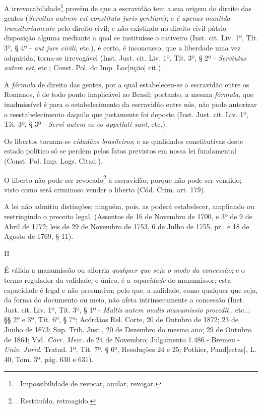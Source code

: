 A irrevocabilidade\footnote{. Impossibilidade de revocar, anular,
  revogar.} provém de que a escravidão tem a sua origem do direito das
gentes (\emph{Servitus autrem est constituto juris gentium}); e \emph{é
apenas mantida transitoriamente} pelo direito civil; e não existindo no
direito civil pátrio disposição alguma mediante a qual se instituísse o
cativeiro (Inst. cit. Liv. 1º, Tít. 3º, § 4º - \emph{aut jure civili},
etc.), é certo, é inconcusso, que a liberdade uma vez adquirida,
torna-se irrevogável (Inst. Just. cit. Liv. 1º, Tít. 3º, § 2º -
\emph{Serviutus autem est}, etc.; Const. Pol. do Imp. Loc{[}ução{]}
cit.).

A \emph{fórmula} de direito das gentes, por a qual estabeleceu-se a
escravidão entre os Romanos, é de todo ponto inaplicável ao Brasil;
portanto, a mesma \emph{fórmula}, que inadmissível é para o
estabelecimento da escravidão entre nós, não pode autorizar o
reestabelecimento daquilo que justamente foi deposto (Inst. Just. cit.
Liv. 1º, Tít. 3º, § 3º - \emph{Servi autem ex eo appellati sunt}, etc.).

Os libertos tornam-se \emph{cidadãos brasileiros}; e as qualidades
constitutivas deste estado político só se perdem pelos fatos previstos
em nossa lei fundamental (Const. Pol. Imp. Logs. Citad.).

O liberto não pode ser revocado\footnote{. Restituído, retroagido.} à
escravidão; porque não pode ser vendido; visto como será criminoso
vender o liberto (Cód. Crim. art. 179).

A lei não admitiu distinções; ninguém, pois, as poderá estabelecer,
ampliando ou restringindo o preceito legal. (Assentos de 16 de Novembro
de 1700, e 3º de 9 de Abril de 1772; leis de 29 de Novembro de 1753, 6
de Julho de 1755, pr., e 18 de Agosto de 1769, § 11).

II

É válida a manumissão ou alforria \emph{qualquer que seja o modo da
concessão}; e o termo regulador da validade, e único, é a
\emph{capacidade} do manumissor; esta capacidade é legal e não
presuntiva; pelo que, a nulidade, como qualquer que seja, da forma do
documento ou meio, não afeta intrinsecamente a concessão (Inst. Just.
cit. Liv. 1º, Tít. 3º, § 1º - \emph{Multis autem modis manumissio
procedit.}, etc..; §§ 2º e 3º, Tít. 6º, § 7º; Acórdãos Rel. Corte, 20 de
Outubro de 1872; 23 de Junho de 1873; Sup. Trib. Just., 20 de Dezembro
do mesmo ano; 29 de Outubro de 1864; Vid. \emph{Corr. Merc.} de 24 de
Novembro; Julgamento 1.486 - Bremeu - \emph{Univ. Jurid.} Tratad. 1º,
Tít. 7º, § 6º, Resoluções 24 e 25; Pothier, Pand{[}ectas{]}, L. 40, Tom.
3º, pág. 630 e 631).

